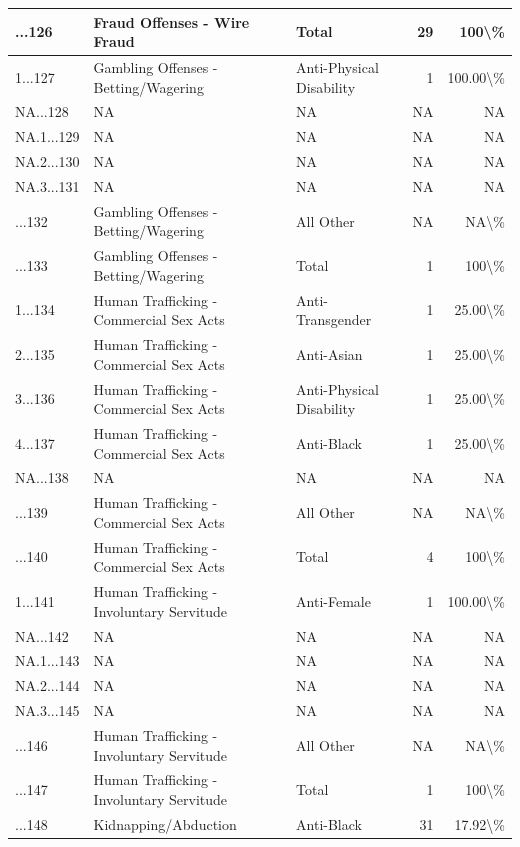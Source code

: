 \documentclass[
]{krantz}
\begin{document}
\begin{longtable}[t]{l|l|l|r|r}
\hline
...126 & Fraud Offenses - Wire Fraud & Total & 29 & 100\textbackslash{}\%\\
\hline
1...127 & Gambling Offenses - Betting/Wagering & Anti-Physical Disability & 1 & 100.00\textbackslash{}\%\\
\hline
NA...128 & NA & NA & NA & NA\\
\hline
NA.1...129 & NA & NA & NA & NA\\
\hline
NA.2...130 & NA & NA & NA & NA\\
\hline
NA.3...131 & NA & NA & NA & NA\\
\hline
...132 & Gambling Offenses - Betting/Wagering & All Other & NA & NA\textbackslash{}\%\\
\hline
...133 & Gambling Offenses - Betting/Wagering & Total & 1 & 100\textbackslash{}\%\\
\hline
1...134 & Human Trafficking - Commercial Sex Acts & Anti-Transgender & 1 & 25.00\textbackslash{}\%\\
\hline
2...135 & Human Trafficking - Commercial Sex Acts & Anti-Asian & 1 & 25.00\textbackslash{}\%\\
\hline
3...136 & Human Trafficking - Commercial Sex Acts & Anti-Physical Disability & 1 & 25.00\textbackslash{}\%\\
\hline
4...137 & Human Trafficking - Commercial Sex Acts & Anti-Black & 1 & 25.00\textbackslash{}\%\\
\hline
NA...138 & NA & NA & NA & NA\\
\hline
...139 & Human Trafficking - Commercial Sex Acts & All Other & NA & NA\textbackslash{}\%\\
\hline
...140 & Human Trafficking - Commercial Sex Acts & Total & 4 & 100\textbackslash{}\%\\
\hline
1...141 & Human Trafficking - Involuntary Servitude & Anti-Female & 1 & 100.00\textbackslash{}\%\\
\hline
NA...142 & NA & NA & NA & NA\\
\hline
NA.1...143 & NA & NA & NA & NA\\
\hline
NA.2...144 & NA & NA & NA & NA\\
\hline
NA.3...145 & NA & NA & NA & NA\\
\hline
...146 & Human Trafficking - Involuntary Servitude & All Other & NA & NA\textbackslash{}\%\\
\hline
...147 & Human Trafficking - Involuntary Servitude & Total & 1 & 100\textbackslash{}\%\\
\hline
...148 & Kidnapping/Abduction & Anti-Black & 31 & 17.92\textbackslash{}\%\\

\end{longtable}
\end{document}

